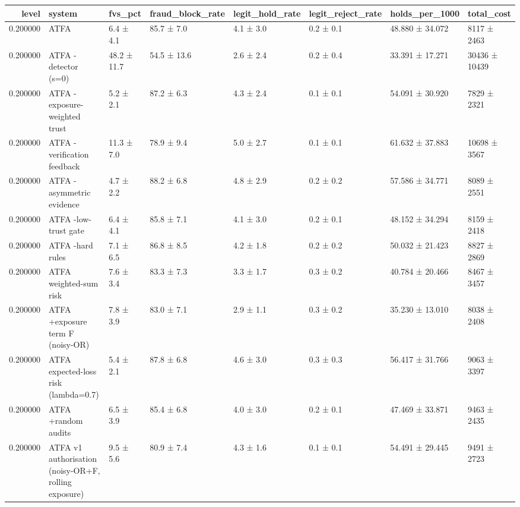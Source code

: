 \begin{tabular}{rlllllll}
\toprule
level & system & fvs\_pct & fraud\_block\_rate & legit\_hold\_rate & legit\_reject\_rate & holds\_per\_1000 & total\_cost \\
\midrule
0.200000 & ATFA & 6.4 ± 4.1 & 85.7 ± 7.0 & 4.1 ± 3.0 & 0.2 ± 0.1 & 48.880 ± 34.072 & 8117 ± 2463 \\
0.200000 & ATFA -detector (s=0) & 48.2 ± 11.7 & 54.5 ± 13.6 & 2.6 ± 2.4 & 0.2 ± 0.4 & 33.391 ± 17.271 & 30436 ± 10439 \\
0.200000 & ATFA -exposure-weighted trust & 5.2 ± 2.1 & 87.2 ± 6.3 & 4.3 ± 2.4 & 0.1 ± 0.1 & 54.091 ± 30.920 & 7829 ± 2321 \\
0.200000 & ATFA -verification feedback & 11.3 ± 7.0 & 78.9 ± 9.4 & 5.0 ± 2.7 & 0.1 ± 0.1 & 61.632 ± 37.883 & 10698 ± 3567 \\
0.200000 & ATFA -asymmetric evidence & 4.7 ± 2.2 & 88.2 ± 6.8 & 4.8 ± 2.9 & 0.2 ± 0.2 & 57.586 ± 34.771 & 8089 ± 2551 \\
0.200000 & ATFA -low-trust gate & 6.4 ± 4.1 & 85.8 ± 7.1 & 4.1 ± 3.0 & 0.2 ± 0.1 & 48.152 ± 34.294 & 8159 ± 2418 \\
0.200000 & ATFA -hard rules & 7.1 ± 6.5 & 86.8 ± 8.5 & 4.2 ± 1.8 & 0.2 ± 0.2 & 50.032 ± 21.423 & 8827 ± 2869 \\
0.200000 & ATFA weighted-sum risk & 7.6 ± 3.4 & 83.3 ± 7.3 & 3.3 ± 1.7 & 0.3 ± 0.2 & 40.784 ± 20.466 & 8467 ± 3457 \\
0.200000 & ATFA +exposure term F (noisy-OR) & 7.8 ± 3.9 & 83.0 ± 7.1 & 2.9 ± 1.1 & 0.3 ± 0.2 & 35.230 ± 13.010 & 8038 ± 2408 \\
0.200000 & ATFA expected-loss risk (lambda=0.7) & 5.4 ± 2.1 & 87.8 ± 6.8 & 4.6 ± 3.0 & 0.3 ± 0.3 & 56.417 ± 31.766 & 9063 ± 3397 \\
0.200000 & ATFA +random audits & 6.5 ± 3.9 & 85.4 ± 6.8 & 4.0 ± 3.0 & 0.2 ± 0.1 & 47.469 ± 33.871 & 9463 ± 2435 \\
0.200000 & ATFA v1 authorisation (noisy-OR+F, rolling exposure) & 9.5 ± 5.6 & 80.9 ± 7.4 & 4.3 ± 1.6 & 0.1 ± 0.1 & 54.491 ± 29.445 & 9491 ± 2723 \\
\bottomrule
\end{tabular}
